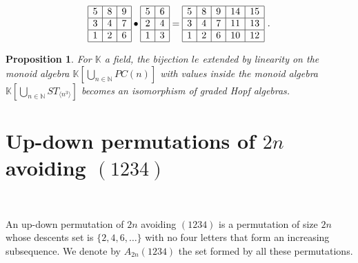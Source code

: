 \documentclass{amsart}
\newtheorem{proposition}[theorem]{Proposition}
\begin{document}
\begin{equation}
  \begin{array}{|c|c|c|} \hline
    5 & 8 & 9 \\ \hline
    3 & 4 & 7 \\ \hline
    1 & 2 & 6 \\ \hline
  \end{array}
  \bullet
  \begin{array}{|c|c|} \hline
    5 & 6 \\ \hline
    2 & 4 \\ \hline
    1 & 3 \\ \hline
  \end{array}
  =
  \begin{array}{|c|c|c|c|c|} \hline
    5 & 8 & 9 & 14 & 15 \\ \hline
    3 & 4 & 7 & 11 & 13 \\ \hline
    1 & 2 & 6 & 10 & 12 \\ \hline
  \end{array}~.
\end{equation}



\begin{proposition}
   For $\mathbb{K}$ a field, the bijection $le$ extended by linearity
   on the monoid algebra $\mathbb{K}[\bigcup_{n \in \mathbb{N}} PC(n)]$
   with values inside the monoid algebra
   $\mathbb{K}[\bigcup_{n \in \mathbb{N}} ST_{\langle n^3 \rangle}]$
   becomes an isomorphism of graded Hopf algebras.
\end{proposition}

\section{Up-down permutations of $2n$ avoiding $(1234)$}~\label{section_up_down}


An up-down permutation of $2n$ avoiding $(1234)$ is a
permutation of size $2n$ whose descents set is $\{2, 4, 6, \dots \}$
with no four letters that form an increasing subsequence. We denote by $A_{2n}(1234)$
the set formed by all these permutations.
\end{document}
